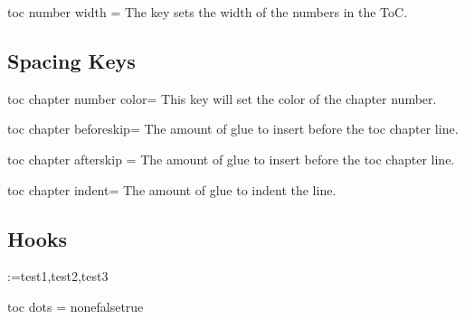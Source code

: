 \begin{docKey}[phd]{toc number width}{ = }{}
The key sets the width of the numbers in the ToC. 
\end{docKey}

\subsection{Spacing Keys}
\begin{docKey}[phd]{toc chapter number color}{=}{}
This key will set the color of the chapter number.
\end{docKey}

\begin{docKey}[phd]{toc chapter beforeskip}{=}{}
The amount of glue to insert before the toc chapter line.
\end{docKey}

\begin{docKey}[phd]{toc chapter afterskip}{ =}{}
The amount of glue to insert before the toc chapter line.
\end{docKey}

\begin{docKey}[phd]{toc chapter indent}{=}{}
The amount of glue to indent the line.
\end{docKey}
\subsection{Hooks}


\makeatletter
\def\options#1{
\@for\next:=#1\do{%
\textbar\next%
}%
\textbar%
}%
\options{test1,test2,test3}
\makeatother
\begin{docKey}[phd]{toc dots}{ = \textbar none\textbar false\textbar true}{}
\end{docKey}

